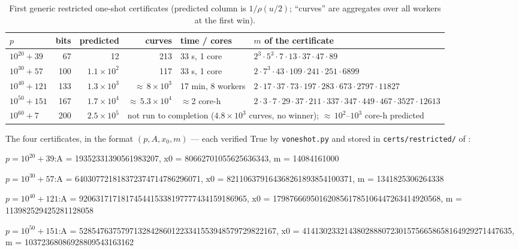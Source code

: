 \documentclass[11pt]{amsart}
\newcommand{\osf}{\cite{OSF}}
\theoremstyle{plain}
\theoremstyle{definition}
\theoremstyle{remark}
\begin{document}
\begin{table}[htbp]
\centering\footnotesize
\begin{tabular}{@{}lrrrll@{}}
\toprule
$p$ & bits & predicted & curves & time / cores & $m$ of the certificate\\
\midrule
$10^{20}+39$ & 67 & 12 & 213 & 33 s, 1 core & $2^3{\cdot}5^3{\cdot}7{\cdot}13{\cdot}37{\cdot}47{\cdot}89$\\
$10^{30}+57$ & 100 & $1.1\times 10^2$ & 117 & 33 s, 1 core & $2{\cdot}7^3{\cdot}43{\cdot}109{\cdot}241{\cdot}251{\cdot}6899$\\
$10^{40}+121$ & 133 & $1.3\times 10^3$ & ${\approx}\,8\times 10^3$ & 17 min, 8 workers & $2{\cdot}17{\cdot}37{\cdot}73{\cdot}197{\cdot}283{\cdot}673{\cdot}2797{\cdot}11827$\\
$10^{50}+151$ & 167 & $1.7\times 10^4$ & ${\approx}\,5.3\times 10^4$ & ${\approx}$2 core-h & $2{\cdot}3{\cdot}7{\cdot}29{\cdot}37{\cdot}211{\cdot}337{\cdot}347{\cdot}449{\cdot}467{\cdot}3527{\cdot}12613$\\
$10^{60}+7$ & 200 & $2.5\times 10^5$ & \multicolumn{3}{l}{not run to completion ($4.8\times 10^3$ curves, no winner); ${\approx}\,10^2$--$10^3$ core-h predicted}\\
\bottomrule
\end{tabular}
\medskip
\caption{First generic restricted one-shot certificates (predicted column is $1/\rho(u/2)$; ``curves''
are aggregates over all workers at the first win).}
\label{tab:restricted}
\end{table}

The four certificates, in the format $(p, A, x_0, m)$ --- each verified True by \texttt{voneshot.py}
and stored in \texttt{certs/restricted/} of \osf:

\medskip
{\footnotesize\ttfamily\raggedright
\noindent $p = 10^{20}{+}39$:\quad A = 19352331390561983207, x0 = 80662701055625636343, m = 14084161000\par
\noindent $p = 10^{30}{+}57$:\quad A = 640307721818372374714786296071, x0 = 821106379164368261893854100371, m = 1341825306264338\par
\noindent $p = 10^{40}{+}121$:\quad A = 9206317171817454415338197777434159186965, x0 = 1798766695016208561785106447263414920568, m = 113982529425281128058\par
\noindent $p = 10^{50}{+}151$:\quad A = 52854763757971328428601223341553948579729822167, x0 = 41413023321438028880723015756658658164929271447635, m = 10372368086928809543163162\par}
\end{document}
